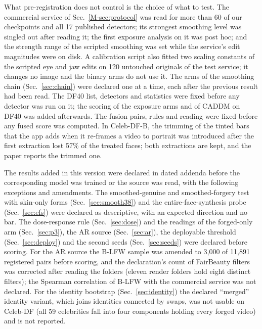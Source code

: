 \documentclass[10pt]{article}
\begin{document}
What pre-registration does not control is the choice of what to test. The commercial service of Sec.~\ref{M-sec:protocol} was
read for more than 60 of our checkpoints and all 17 published detectors; its strongest smoothing level was singled out after
reading it; the first exposure analysis on it was post hoc; and the strength range of the scripted smoothing was set while the
service's edit magnitudes were on disk. A calibration script also fitted two scaling constants of the scripted eye and jaw edits on 120
untouched originals of the test service; it changes no image and the binary arms do not use it. The arms of the smoothing chain (Sec.~\ref{sec:chain}) were declared one at a time, each
after the previous result had been read. The DF40 list, detectors and statistics were fixed before any detector was run on it;
the scoring of the exposure arms and of CADDM on DF40 was added afterwards. The fusion pairs, rules and reading were fixed before
any fused score was computed. In Celeb-DF-B, the trimming of the tinted bars that the app adds when it re-frames a video to
portrait was introduced after the first extraction lost 57\% of the treated faces; both extractions are kept, and the paper
reports the trimmed one.

The results added in this version were declared in dated addenda before the corresponding model was trained or the source was
read, with the following exceptions and amendments. The smoothed-genuine and smoothed-forgery test with skin-only forms
(Sec.~\ref{sec:smooth38}) and the entire-face-synthesis probe (Sec.~\ref{sec:efs}) were declared as descriptive, with an expected
direction and no bar. The dose-response rule (Sec.~\ref{sec:dose}) and the readings of the forged-only arm (Sec.~\ref{sec:p3}), the
AR source (Sec.~\ref{sec:ar}), the deployable threshold (Sec.~\ref{sec:deploy}) and the second seeds (Sec.~\ref{sec:seeds}) were
declared before scoring. For the AR source the B-LFW sample was amended to 3,000 of 11,891 registered pairs before scoring, and the
declaration's count of FairBeauty filters was corrected after reading the folders (eleven render folders hold eight distinct
filters); the Spearman correlation of B-LFW with the commercial service was not declared. For the identity bootstrap
(Sec.~\ref{sec:identity}) the declared ``merged'' identity variant, which joins identities connected by swaps, was not usable on
Celeb-DF (all 59 celebrities fall into four components holding every forged video) and is not reported.
\end{document}
